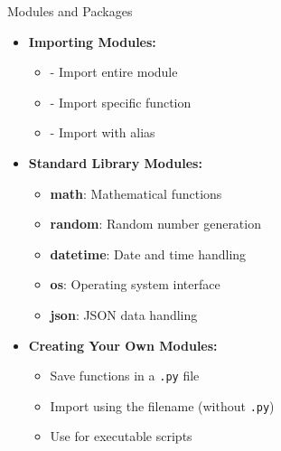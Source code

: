 \begin{frame}{Modules and Packages}
    \begin{itemize}
        \item \textbf{Importing Modules:}
        \begin{itemize}
            \item {} - Import entire module
            \item {} - Import specific function
            \item {} - Import with alias
        \end{itemize}
        
        \item \textbf{Standard Library Modules:}
        \begin{itemize}
            \item \textbf{math}: Mathematical functions
            \item \textbf{random}: Random number generation
            \item \textbf{datetime}: Date and time handling
            \item \textbf{os}: Operating system interface
            \item \textbf{json}: JSON data handling
        \end{itemize}
        
        \item \textbf{Creating Your Own Modules:}
        \begin{itemize}
            \item Save functions in a \texttt{.py} file
            \item Import using the filename (without \texttt{.py})
            \item Use  for executable scripts
        \end{itemize}
    \end{itemize}
\end{frame}
